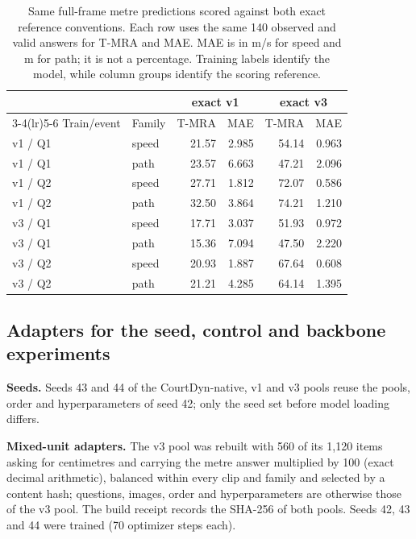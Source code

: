 \documentclass[11pt]{article}
\begin{document}
\begin{table}[t]
\centering\small
\setlength{\tabcolsep}{4pt}
\caption{Same full-frame metre predictions scored against both exact
reference conventions. Each row uses the same 140 observed and valid
answers for T-MRA and MAE. MAE is in m/s for speed and m for path; it is
not a percentage. Training labels identify the model, while column groups
identify the scoring reference.}
\label{tab:paired_reference_scores}
\begin{tabular}{llrrrr}
\toprule
 & & \multicolumn{2}{c}{exact v1} & \multicolumn{2}{c}{exact v3} \\
\cmidrule(lr){3-4}\cmidrule(lr){5-6}
Train/event & Family & T-MRA & MAE & T-MRA & MAE \\
\midrule
v1 / Q1 & speed & 21.57 & 2.985 & 54.14 & 0.963 \\
v1 / Q1 & path & 23.57 & 6.663 & 47.21 & 2.096 \\
v1 / Q2 & speed & 27.71 & 1.812 & 72.07 & 0.586 \\
v1 / Q2 & path & 32.50 & 3.864 & 74.21 & 1.210 \\
v3 / Q1 & speed & 17.71 & 3.037 & 51.93 & 0.972 \\
v3 / Q1 & path & 15.36 & 7.094 & 47.50 & 2.220 \\
v3 / Q2 & speed & 20.93 & 1.887 & 67.64 & 0.608 \\
v3 / Q2 & path & 21.21 & 4.285 & 64.14 & 1.395 \\
\bottomrule
\end{tabular}
\end{table}


\subsection{Adapters for the seed, control and backbone experiments}
\label{app:revision_adapters}

\textbf{Seeds.} Seeds 43 and 44 of the CourtDyn-native, v1 and v3 pools reuse
the pools, order and hyperparameters of seed 42; only the seed set before model
loading differs.

\textbf{Mixed-unit adapters.} The v3 pool was rebuilt with 560 of its 1,120 items
asking for centimetres and carrying the metre answer multiplied by 100 (exact
decimal arithmetic), balanced within every clip and family and selected by a
content hash; questions, images, order and hyperparameters are otherwise those of
the v3 pool. The build receipt records the SHA-256 of both pools. Seeds 42, 43
and 44 were trained (70 optimizer steps each).
\end{document}
